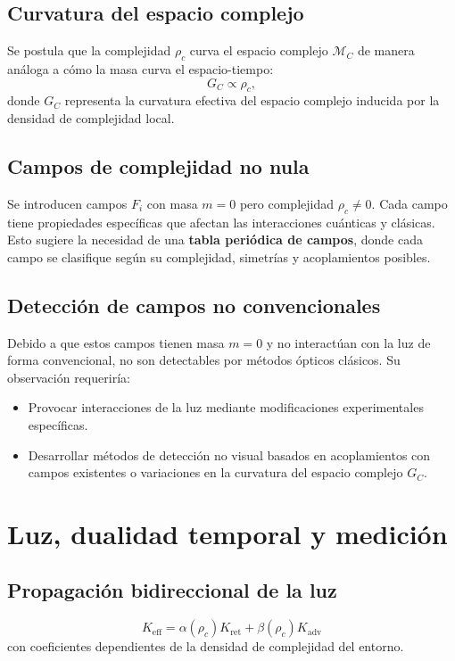 \documentclass[reprint,amsmath,amssymb,aps]{revtex4-2}
\begin{document}
\subsection{Curvatura del espacio complejo}
Se postula que la complejidad $\rho_c$ curva el espacio complejo $\mathcal{M}_C$ de manera análoga a cómo la masa curva el espacio-tiempo:
\begin{equation}
G_C \propto \rho_c,
\end{equation}
donde $G_C$ representa la curvatura efectiva del espacio complejo inducida por la densidad de complejidad local.

\subsection{Campos de complejidad no nula}
Se introducen campos $F_i$ con masa $m=0$ pero complejidad $\rho_c \neq 0$. Cada campo tiene propiedades específicas que afectan las interacciones cuánticas y clásicas. Esto sugiere la necesidad de una \textbf{tabla periódica de campos}, donde cada campo se clasifique según su complejidad, simetrías y acoplamientos posibles.

\subsection{Detección de campos no convencionales}
Debido a que estos campos tienen masa $m=0$ y no interactúan con la luz de forma convencional, no son detectables por métodos ópticos clásicos. Su observación requeriría: 
\begin{itemize}
    \item Provocar interacciones de la luz mediante modificaciones experimentales específicas.
    \item Desarrollar métodos de detección no visual basados en acoplamientos con campos existentes o variaciones en la curvatura del espacio complejo $G_C$.
\end{itemize}

\section{Luz, dualidad temporal y medición}
\subsection{Propagación bidireccional de la luz}
\begin{equation}
K_{\text{eff}} = \alpha(\rho_c) K_{\text{ret}} + \beta(\rho_c) K_{\text{adv}}
\end{equation}
con coeficientes dependientes de la densidad de complejidad del entorno.
\end{document}

